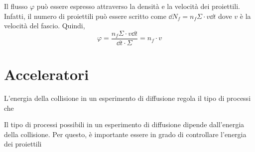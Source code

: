 \documentclass[../main.tex]{subfiles}
\begin{document}
Il flusso $\varphi$ può essere espresso attraverso la densità e la velocità dei proiettili. Infatti, il numero di proiettili può essere scritto come $\dd N_f = n_f \Sigma \cdot v \dd t$ dove $v$ è la velocità del fascio. Quindi, 
\begin{equation}
    \varphi = \frac{n_f \Sigma \cdot v \dd t}{\dd t \cdot \Sigma} = n_f \cdot v
\end{equation}

\section{Acceleratori}
L'energia della collisione in un esperimento di diffusione regola il tipo di processi che 

Il tipo di processi possibili in un esperimento di diffusione dipende dall'energia della collisione. Per questo, è importante essere in grado di controllare l'energia dei proiettili 
\end{document}
